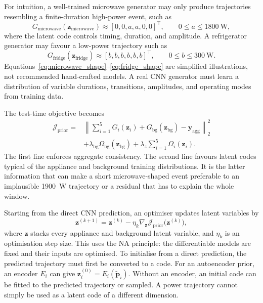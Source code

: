 \documentclass[11pt]{article}
\newcommand{\vect}[1]{\mathbf{#1}}
\begin{document}
For intuition, a well-trained microwave generator may only produce trajectories resembling a finite-duration high-power event, such as
\begin{equation}
    G_{\mathrm{microwave}}(\vect{z}_{\mathrm{microwave}})
    \approx[0,0,a,a,0,0]^{\top},
    \qquad 0\leq a\leq 1800\ \mathrm{W},
    \label{eq:microwave_shape}
\end{equation}
where the latent code controls timing, duration, and amplitude. A refrigerator generator may favour a low-power trajectory such as
\begin{equation}
    G_{\mathrm{fridge}}(\vect{z}_{\mathrm{fridge}})
    \approx[b,b,b,b,b,b]^{\top},
    \qquad 0\leq b\leq 300\ \mathrm{W}.
    \label{eq:fridge_shape}
\end{equation}
Equations~\eqref{eq:microwave_shape}--\eqref{eq:fridge_shape} are simplified illustrations, not recommended hand-crafted models. A real CNN generator must learn a distribution of variable durations, transitions, amplitudes, and operating modes from training data.

The test-time objective becomes
\begin{equation}
\begin{split}
    \mathcal{J}_{\mathrm{prior}}=
    &\left\|
    \sum_{i=1}^{5}G_i(\vect{z}_i)+G_{\mathrm{bg}}(\vect{z}_{\mathrm{bg}})-
    \vect{y}_{\mathrm{agg}}
    \right\|_2^2\\
    &+\lambda_{\mathrm{bg}}\Omega_{\mathrm{bg}}(\vect{z}_{\mathrm{bg}})
    +\lambda_z\sum_{i=1}^{5}\Omega_i(\vect{z}_i).
    \label{eq:example_prior_objective}
\end{split}
\end{equation}
The first line enforces aggregate consistency. The second line favours latent codes typical of the appliance and background training distributions. It is the latter information that can make a short microwave-shaped event preferable to an implausible 1900~W trajectory or a residual that has to explain the whole window.

Starting from the direct CNN prediction, an optimiser updates latent variables by
\begin{equation}
    \vect{z}^{(k+1)}=
    \vect{z}^{(k)}-
    \eta_k\nabla_{\vect{z}}
    \mathcal{J}_{\mathrm{prior}}\bigl(\vect{z}^{(k)}\bigr),
    \label{eq:latent_update_example}
\end{equation}
where $\vect{z}$ stacks every appliance and background latent variable, and $\eta_k$ is an optimisation step size. This uses the NA principle: the differentiable models are fixed and their inputs are optimised. To initialise from a direct prediction, the predicted trajectory must first be converted to a code. For an autoencoder prior, an encoder $E_i$ can give $\vect{z}_i^{(0)}=E_i(\tilde{\vect{p}}_i)$. Without an encoder, an initial code can be fitted to the predicted trajectory or sampled. A power trajectory cannot simply be used as a latent code of a different dimension.
\end{document}
